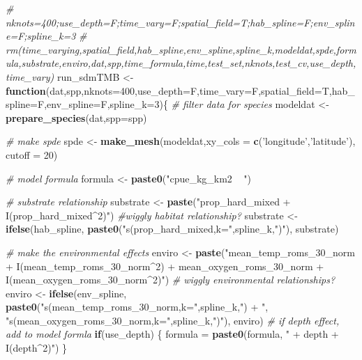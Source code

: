 \documentclass[
]{article}
\newenvironment{Shaded}{\begin{snugshade}}{\end{snugshade}}
\newcommand{\CommentTok}[1]{\textcolor[rgb]{0.56,0.35,0.01}{\textit{#1}}}
\newcommand{\ControlFlowTok}[1]{\textcolor[rgb]{0.13,0.29,0.53}{\textbf{#1}}}
\newcommand{\DataTypeTok}[1]{\textcolor[rgb]{0.13,0.29,0.53}{#1}}
\newcommand{\DecValTok}[1]{\textcolor[rgb]{0.00,0.00,0.81}{#1}}
\newcommand{\KeywordTok}[1]{\textcolor[rgb]{0.13,0.29,0.53}{\textbf{#1}}}
\newcommand{\NormalTok}[1]{#1}
\newcommand{\StringTok}[1]{\textcolor[rgb]{0.31,0.60,0.02}{#1}}
\begin{document}
\begin{Shaded}
\begin{Highlighting}[]
\CommentTok{# nknots=400;use_depth=F;time_vary=F;spatial_field=T;hab_spline=F;env_spline=F;spline_k=3}
\CommentTok{# rm(time_varying,spatial_field,hab_spline,env_spline,spline_k,modeldat,spde,formula,substrate,enviro,dat,spp,time_formula,time,test_set,nknots,test_cv,use_depth,time_vary)}
\NormalTok{run_sdmTMB <-}\StringTok{ }\ControlFlowTok{function}\NormalTok{(dat,spp,}\DataTypeTok{nknots=}\DecValTok{400}\NormalTok{,}\DataTypeTok{use_depth=}\NormalTok{F,}\DataTypeTok{time_vary=}\NormalTok{F,}\DataTypeTok{spatial_field=}\NormalTok{T,}\DataTypeTok{hab_spline=}\NormalTok{F,}\DataTypeTok{env_spline=}\NormalTok{F,}\DataTypeTok{spline_k=}\DecValTok{3}\NormalTok{)\{}
  \CommentTok{# filter data for species}
\NormalTok{  modeldat <-}\StringTok{ }\KeywordTok{prepare_species}\NormalTok{(dat,}\DataTypeTok{spp=}\NormalTok{spp)}
  
  \CommentTok{# make spde}
\NormalTok{  spde <-}\StringTok{ }\KeywordTok{make_mesh}\NormalTok{(modeldat,}\DataTypeTok{xy_cols =} \KeywordTok{c}\NormalTok{(}\StringTok{'longitude'}\NormalTok{,}\StringTok{'latitude'}\NormalTok{), }
                   \DataTypeTok{cutoff =} \DecValTok{20}\NormalTok{)}
  
  \CommentTok{# model formula}
\NormalTok{  formula <-}\StringTok{ }\KeywordTok{paste0}\NormalTok{(}\StringTok{"cpue_kg_km2 ~ "}\NormalTok{)}
  
  \CommentTok{# substrate relationship}
\NormalTok{  substrate <-}\StringTok{ }\KeywordTok{paste}\NormalTok{(}\StringTok{"prop_hard_mixed + I(prop_hard_mixed^2)"}\NormalTok{)}
  \CommentTok{#wiggly habitat relationship?}
\NormalTok{  substrate <-}\StringTok{ }\KeywordTok{ifelse}\NormalTok{(hab_spline, }\KeywordTok{paste0}\NormalTok{(}\StringTok{"s(prop_hard_mixed,k="}\NormalTok{,spline_k,}\StringTok{")"}\NormalTok{),}
\NormalTok{                      substrate)}
  
  \CommentTok{# make the environmental effects}
\NormalTok{  enviro <-}\StringTok{ }\KeywordTok{paste}\NormalTok{(}\StringTok{"mean_temp_roms_30_norm + }
\StringTok{                  I(mean_temp_roms_30_norm^2) + }
\StringTok{                  mean_oxygen_roms_30_norm + }
\StringTok{                  I(mean_oxygen_roms_30_norm^2)"}\NormalTok{)}
  \CommentTok{# wiggly environmental relationships?}
\NormalTok{  enviro <-}\StringTok{ }\KeywordTok{ifelse}\NormalTok{(env_spline, }\KeywordTok{paste0}\NormalTok{(}\StringTok{"s(mean_temp_roms_30_norm,k="}\NormalTok{,spline_k,}\StringTok{") + "}\NormalTok{,}
                                      \StringTok{"s(mean_oxygen_roms_30_norm,k="}\NormalTok{,spline_k,}\StringTok{")"}\NormalTok{),}
\NormalTok{                   enviro)}
  \CommentTok{# if depth effect, add to model formla}
  \ControlFlowTok{if}\NormalTok{(use_depth) \{}
\NormalTok{    formula =}\StringTok{ }\KeywordTok{paste0}\NormalTok{(formula, }\StringTok{" + depth + I(depth^2)"}\NormalTok{)}
\NormalTok{  \}}
  

\end{Highlighting}
\end{Shaded}
\end{document}
